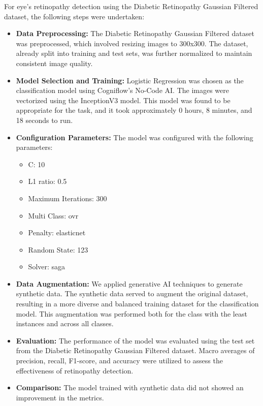 For eye's retinopathy detection using the Diabetic Retinopathy Gaussian Filtered dataset, the following steps were undertaken:

\begin{itemize}
    \item \textbf{Data Preprocessing:} The Diabetic Retinopathy Gaussian Filtered dataset was preprocessed, which involved resizing images to 300x300. The dataset, already split into training and test sets, was further normalized to maintain consistent image quality.

    \item \textbf{Model Selection and Training:} Logistic Regression was chosen as the classification model using Cogniflow's No-Code AI. The images were vectorized using the InceptionV3 model. This model was found to be appropriate for the task, and it took approximately 0 hours, 8 minutes, and 18 seconds to run.

    \item \textbf{Configuration Parameters:} The model was configured with the following parameters:
    \begin{itemize}
        \item C: 10
        \item L1 ratio: 0.5
        \item Maximum Iterations: 300
        \item Multi Class: ovr
        \item Penalty: elasticnet
        \item Random State: 123
        \item Solver: saga
    \end{itemize}

    \item \textbf{Data Augmentation:} We applied generative AI techniques to generate synthetic data. The synthetic data served to augment the original dataset, resulting in a more diverse and balanced training dataset for the classification model. This augmentation was performed both for the class with the least instances and across all classes.

    \item \textbf{Evaluation:} The performance of the model was evaluated using the test set from the Diabetic Retinopathy Gaussian Filtered dataset. Macro averages of precision, recall, F1-score, and accuracy were utilized to assess the effectiveness of retinopathy detection. 

    \item \textbf{Comparison:} The model trained with synthetic data did not showed an improvement in the metrics. 

\end{itemize}

